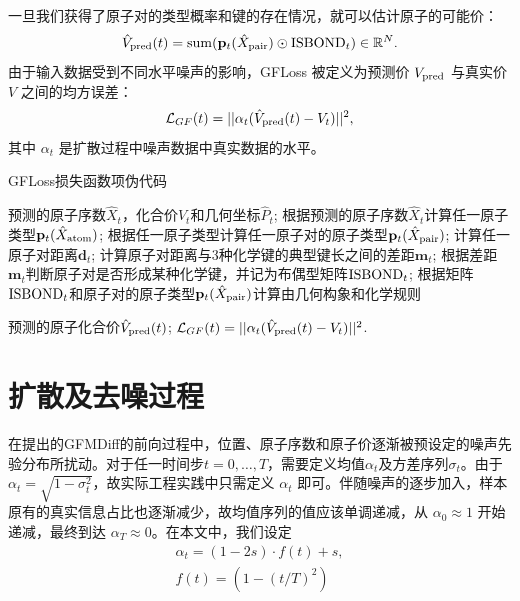 一旦我们获得了原子对的类型概率和键的存在情况，就可以估计原子的可能价：
\begin{equation}
     \hat{V}_{{\rm pred}}(t) = {\rm sum}({\mathbf{p}}_t(\hat{X}_{{\rm pair}}) \odot {\rm ISBOND}_t) \in \mathbb{R}^{N}.
\end{equation}
由于输入数据受到不同水平噪声的影响，GFLoss 被定义为预测价 $V_{{\rm pred}}$ 与真实价 $V$ 之间的均方误差：
\begin{equation}
    \mathcal{L}_{GF}(t) = ||\alpha_t(\hat{V}_{{\rm pred}}(t) - V_t)||^2,
\end{equation}
其中 $\alpha_t$ 是扩散过程中噪声数据中真实数据的水平。

\begin{algorithm}[H]
    \caption{GFLoss损失函数项伪代码}
    \label{alg:gfloss}
    \begin{algorithmic}
     预测的原子序数$\hat{X}_t$，化合价$\hat{V}_t$和几何坐标$\hat{P}_t$;
    \STATE 根据预测的原子序数$\hat{X}_t$计算任一原子类型${\mathbf{p}}_t(\hat{X}_{{\rm atom}})$;
    \STATE 根据任一原子类型计算任一原子对的原子类型${\mathbf{p}}_t(\hat{X}_{{\rm pair}})$;
    \STATE 计算任一原子对距离$\mathbf{d}_t$;
    \STATE 计算原子对距离与3种化学键的典型键长之间的差距$\mathbf{m}_t$;
    \STATE 根据差距$\mathbf{m}_t$判断原子对是否形成某种化学键，并记为布偶型矩阵${\rm ISBOND}_t$;
    \STATE 根据矩阵${\rm ISBOND}_t$和原子对的原子类型${\mathbf{p}}_t(\hat{X}_{{\rm pair}})$计算由几何构象和化学规则
    
    预测的原子化合价$\hat{V}_{{\rm pred}}(t)$;
     $\mathcal{L}_{GF}(t) = ||\alpha_t(\hat{V}_{{\rm pred}}(t) - V_t)||^2$.
    \end{algorithmic}
\end{algorithm}

\section{扩散及去噪过程}
在提出的GFMDiff的前向过程中，位置、原子序数和原子价逐渐被预设定的噪声先验分布所扰动。对于任一时间步$t = 0, \ldots, T$，需要定义均值$\alpha_t$及方差序列$\sigma_t$。由于 $\alpha_t = \sqrt{1 - \sigma_t^2}$，故实际工程实践中只需定义 $\alpha_t$ 即可。伴随噪声的逐步加入，样本原有的真实信息占比也逐渐减少，故均值序列的值应该单调递减，从 $\alpha_0 \approx 1$ 开始递减，最终到达 $\alpha_T \approx 0$。在本文中，我们设定
\begin{eqnarray}
    &\alpha_t = (1 - 2s) \cdot f(t) + s, & \\
    &f(t) = (1 - (t/T)^2)& 
\end{eqnarray}

